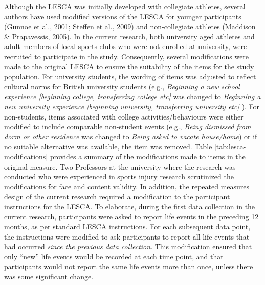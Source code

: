 \documentclass[man,floatsintext]{apa6}
\begin{document}
Although the LESCA was initially developed with collegiate athletes, several authors have used modified versions of the LESCA for younger participants (Gunnoe et al., 2001; Steffen et al., 2009) and non-collegiate athletes (Maddison \& Prapavessis, 2005).
In the current research, both university aged athletes and adult members of local sports clubs who were not enrolled at university, were recruited to participate in the study.
Consequently, several modifications were made to the original LESCA to ensure the suitability of the items for the study population.
For university students, the wording of items was adjusted to reflect cultural norms for British university students (e.g., \emph{Beginning a new school experience {[}beginning college, transferring college etc{]}} was changed to \emph{Beginning a new university experience {[}beginning university, transferring university etc{]}} ).
For non-students, items associated with college activities/behaviours were either modified to include comparable non-student events (e.g., \emph{Being dismissed from dorm or other residence} was changed to \emph{Being asked to vacate house/home}) or if no suitable alternative was available, the item was removed.
Table \ref{tab:lesca-modifications} provides a summary of the modifications made to items in the original measure.
Two Professors at the university where the research was conducted who were experienced in sports injury research scrutinized the modifications for face and content validity.
In addition, the repeated measures design of the current research required a modification to the participant instructions for the LESCA.
To elaborate, during the first data collection in the current research, participants were asked to report life events in the preceding 12 months, as per standard LESCA instructions.
For each subsequent data point, the instructions were modified to ask participants to report all life events that had occurred \emph{since the previous data collection}.
This modification ensured that only \enquote{new} life events would be recorded at each time point, and that participants would not report the same life events more than once, unless there was some significant change.
\end{document}
